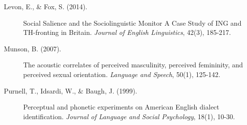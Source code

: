 \documentclass[a0,final]{a0poster}
\begin{document}
\begin{multicols}{4}
\begin{description}
\item[Levon, E., \& Fox, S. (2014).]{ Social Salience and the Sociolinguistic Monitor A Case Study of ING and TH-fronting in Britain. \textit{Journal of English Linguistics}, 42(3), 185-217.}

\item[Munson, B. (2007).]{The acoustic correlates of perceived masculinity, perceived femininity, and perceived sexual orientation. \textit{Language and Speech}, 50(1), 125-142.}

\item[Purnell, T., Idsardi, W., \& Baugh, J. (1999).]{ Perceptual and phonetic experiments on American English dialect identification. \textit{Journal of Language and Social Psychology}, 18(1), 10-30.}


\end{description}
%
%

\end{multicols}
\end{document}
